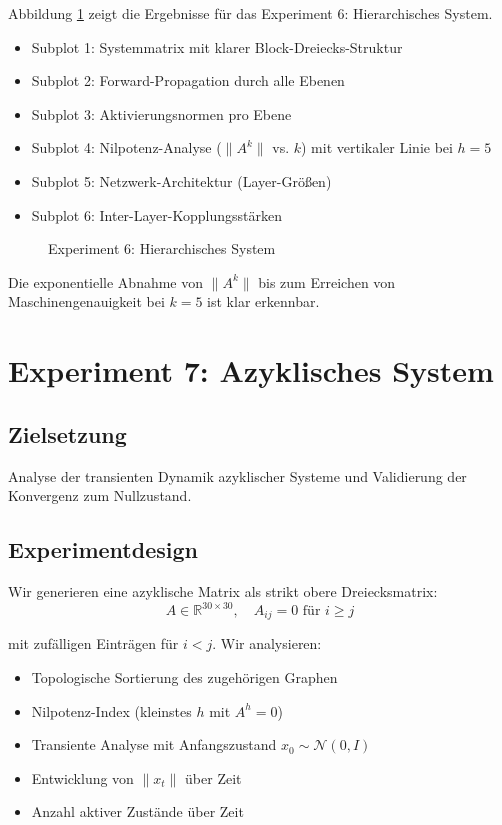 \documentclass[a4paper,12pt]{report}
\theoremstyle{definition}
\begin{document}
	Abbildung \ref{fig:exp6} zeigt die Ergebnisse für das Experiment 6: Hierarchisches System.
	\begin{itemize}
		\item Subplot 1: Systemmatrix mit klarer Block-Dreiecks-Struktur
		\item Subplot 2: Forward-Propagation durch alle Ebenen
		\item Subplot 3: Aktivierungsnormen pro Ebene
		\item Subplot 4: Nilpotenz-Analyse ($\|A^k\|$ vs. $k$) mit vertikaler Linie bei $h=5$
		\item Subplot 5: Netzwerk-Architektur (Layer-Größen)
		\item Subplot 6: Inter-Layer-Kopplungsstärken
	\end{itemize}
	
	\begin{figure}[H]
		\centering
		\caption{Experiment 6: Hierarchisches System}
		\label{fig:exp6}
	\end{figure}
	
	Die exponentielle Abnahme von $\|A^k\|$ bis zum Erreichen von Maschinengenauigkeit bei $k=5$ ist klar erkennbar.
	
	\section{Experiment 7: Azyklisches System}
	
	\subsection{Zielsetzung}
	
	Analyse der transienten Dynamik azyklischer Systeme und Validierung der Konvergenz zum Nullzustand.
	
	\subsection{Experimentdesign}
	
	Wir generieren eine azyklische Matrix als strikt obere Dreiecksmatrix:
	\[
	A \in \mathbb{R}^{30 \times 30}, \quad A_{ij} = 0 \text{ für } i \geq j
	\]
	
	mit zufälligen Einträgen für $i < j$. Wir analysieren:
	
	\begin{itemize}
		\item Topologische Sortierung des zugehörigen Graphen
		\item Nilpotenz-Index (kleinstes $h$ mit $A^h = 0$)
		\item Transiente Analyse mit Anfangszustand $x_0 \sim \mathcal{N}(0, I)$
		\item Entwicklung von $\|x_t\|$ über Zeit
		\item Anzahl aktiver Zustände über Zeit
	\end{itemize}
	
\end{document}
